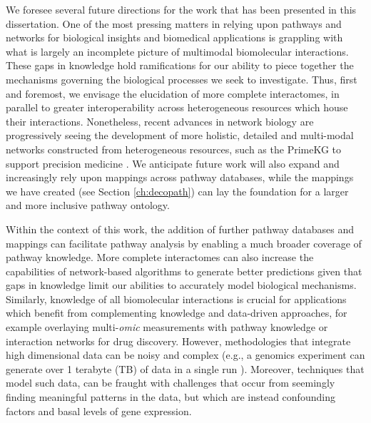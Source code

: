 We foresee several future directions for the work that has been presented in this dissertation. One of the most pressing matters in relying upon pathways and networks for biological insights and biomedical applications is grappling with what is largely an incomplete picture of multimodal biomolecular interactions. These gaps in knowledge hold ramifications for our ability to piece together the mechanisms governing the biological processes we seek to investigate. Thus, first and foremost, we envisage the elucidation of more complete interactomes, in parallel to greater interoperability across heterogeneous resources which house their interactions. Nonetheless, recent advances in network biology are progressively seeing the development of more holistic, detailed and multi-modal networks constructed from heterogeneous resources, such as the PrimeKG to support precision medicine \parencite{chandak2022}. We anticipate future work will also expand and increasingly rely upon mappings across pathway databases, while the mappings we have created (see Section \ref{ch:decopath}) can lay the foundation for a larger and more inclusive pathway ontology. 

Within the context of this work, the addition of further pathway databases and mappings can facilitate pathway analysis by enabling a much broader coverage of pathway knowledge. More complete interactomes can also increase the capabilities of network-based algorithms to generate better predictions given that gaps in knowledge limit our abilities to accurately model biological mechanisms. Similarly, knowledge of all biomolecular interactions is crucial for applications which benefit from complementing knowledge and data-driven approaches, for example overlaying multi-\textit{omic} measurements with pathway knowledge or interaction networks for drug discovery. However, methodologies that integrate high dimensional data can be noisy and complex (e.g., a genomics experiment can generate over 1 terabyte (TB) of data in a single run \parencite{hasenauer2022}). Moreover, techniques that model such data, can be fraught with challenges that occur from seemingly finding meaningful patterns in the data, but which are instead confounding factors and basal levels of gene expression. 

